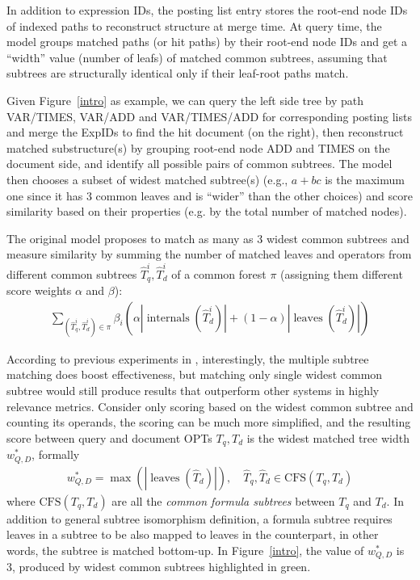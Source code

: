 \documentclass[runningheads]{llncs}
\begin{document}
In addition to expression IDs, the posting list entry stores the root-end node IDs of indexed paths to reconstruct structure at merge time.
%
At query time, the model groups matched paths (or hit paths) by their root-end node IDs and get a ``width'' value (number of leafs) of matched common subtrees, assuming that subtrees are structurally identical only if their leaf-root paths match.

Given Figure~\ref{intro} as example, we can query the left side tree by path VAR/TIMES, VAR/ADD and VAR/TIMES/ADD for corresponding posting lists and merge the ExpIDs to find the hit document (on the right), then reconstruct matched substructure(s) by grouping root-end node ADD and TIMES on the document side, and identify all possible pairs of common subtrees. The model then chooses a subset of widest matched subtree(s) (e.g., $a+bc$ is the maximum one since it has 3 common leaves and is ``wider'' than the other choices) and score similarity based on their properties (e.g. by the total number of matched nodes).

The original model proposes to match as many as 3 widest common subtrees and measure similarity by summing the number of matched leaves and operators from different common subtrees $\hat{T}_q^i, \hat{T}_d^i$ of a common forest $\pi$ (assigning them different score weights $\alpha$ and $\beta$):
\begin{align}
\label{eq:1}
\sum_{(\hat{T}_q^i, \hat{T}_d^i) \in \pi} \beta_i \left( \alpha \left|\operatorname{internals}(\hat{T}_d^i)\right| + (1 - \alpha) \left|\operatorname{leaves}(\hat{T}_d^i)\right| \right) 
\end{align}

%
According to previous experiments in \cite{a0_2019}, interestingly, the multiple subtree matching does boost effectiveness, but matching only single widest common subtree would still produce results that outperform other systems in highly relevance metrics.
%
Consider only scoring based on the widest common subtree and counting its operands, the scoring can be much more simplified, and the resulting score between query and document OPTs $T_q, T_d$ is the widest matched tree width $w^*_{Q, D}$, formally
\begin{align}
\label{eq:2}
w^*_{Q, D} = \max(|\operatorname{leaves}(\hat{T}_d)|), \quad \hat{T}_q, \hat{T}_d \in \text{CFS}(T_q, T_d)
\end{align}
where
$\text{CFS}(T_q, T_d)$ are all the \textit{common formula subtrees} between $T_q$ and $T_d$.
In addition to general subtree isomorphism definition, a formula subtree requires leaves in a subtree to be also mapped to leaves in the counterpart, in other words, the subtree is matched bottom-up.
%
In Figure~\ref{intro}, the value of $w^*_{Q, D}$ is 3, produced by widest common subtrees highlighted in green.
\end{document}
